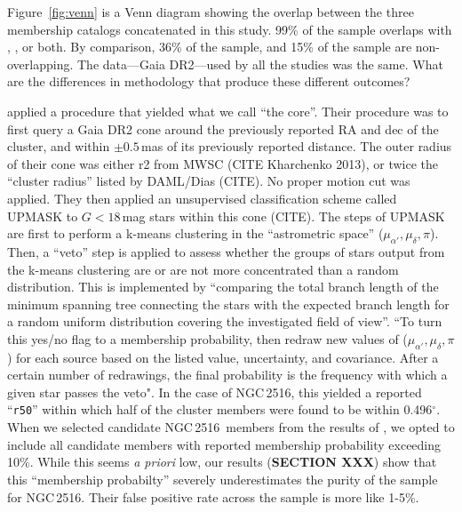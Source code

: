 \documentclass[12pt,twocolumn,tighten]{aastex63}
\newcommand{\cn}{NGC\,2516} %
\begin{document}
Figure~\ref{fig:venn} is a Venn diagram showing the overlap between
the three membership catalogs concatenated in this study.  99\% of the
 sample overlaps with
, , or
both.  By comparison, 36\% of the 
sample, and 15\% of the  sample are
non-overlapping.
The data---Gaia DR2---used by all the studies was the same.
What are the differences in methodology that produce these different
outcomes?

%
%
 applied a procedure that 
yielded what we call ``the core''.  Their procedure was to first query
a Gaia DR2 cone around the previously reported RA and dec of the
cluster, and within $\pm 0.5$\,mas of its previously reported
distance. 
The outer radius of their cone was either r2 from MWSC (CITE
Kharchenko 2013), or twice the ``cluster radius'' listed by DAML/Dias (CITE).  No
proper motion cut was applied.  They then applied an unsupervised
classification scheme called UPMASK to $G<18$\,mag stars within this
cone (CITE).  The steps of UPMASK are first to perform a k-means
clustering in the ``astrometric space'' ($\mu_{\alpha'}, \mu_\delta,
\pi$).  Then, a ``veto'' step is applied to assess whether the groups
of stars output from the k-means clustering are or are not more
concentrated than a random distribution.  This is implemented by
``comparing the total branch length of the minimum spanning tree
connecting the stars with the expected branch length for a random
uniform distribution covering the investigated field of view''.  ``To
turn this yes/no flag to a membership probability,
\citet{cantatgaudin_gaia_2018} then redraw new values of
($\mu_{\alpha'}, \mu_\delta, \pi$) for each source based on the listed
value, uncertainty, and covariance.  After a certain number of
redrawings, the final probability is the frequency with which a given
star passes the veto".  In the case of \cn, this yielded a reported
``\texttt{r50}'' within which half of the cluster members were found
to be within 0.496$^\circ$.
When we selected candidate \cn\ members from the results of
, we opted to include all candidate members
with reported membership probability exceeding 10\%.
While this seems {\it a priori} low, our results ({\bf SECTION XXX})
show that this ``membership probabilty'' severely underestimates the
purity of the  sample for \cn. 
Their false positive rate across the sample is more like 1-5\%.
\end{document}
